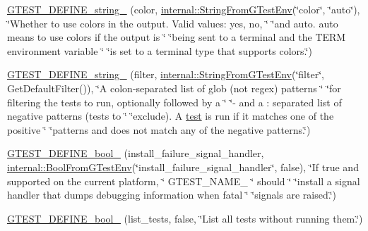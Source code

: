 \begin{DoxyCompactItemize}
\item 
\mbox{\hyperlink{namespacetesting_a32f0280e95e7718835b0e3d2f7277269}{G\+T\+E\+S\+T\+\_\+\+D\+E\+F\+I\+N\+E\+\_\+string\+\_\+}} (color, \mbox{\hyperlink{namespacetesting_1_1internal_a7ed785df46a339403b0f749d3a879201}{internal\+::\+String\+From\+G\+Test\+Env}}(\char`\"{}color\char`\"{}, \char`\"{}auto\char`\"{}), \char`\"{}Whether to use colors in the output.  Valid values\+: yes, no, \char`\"{} \char`\"{}and auto.  \textquotesingle{}auto\textquotesingle{} means to use colors if the output is \char`\"{} \char`\"{}being sent to a terminal and the T\+E\+RM environment variable \char`\"{} \char`\"{}is set to a terminal type that supports colors.\char`\"{})
\item 
\mbox{\hyperlink{namespacetesting_a2830ee1f2237233fa44aa580c5a919ce}{G\+T\+E\+S\+T\+\_\+\+D\+E\+F\+I\+N\+E\+\_\+string\+\_\+}} (filter, \mbox{\hyperlink{namespacetesting_1_1internal_a7ed785df46a339403b0f749d3a879201}{internal\+::\+String\+From\+G\+Test\+Env}}(\char`\"{}filter\char`\"{}, Get\+Default\+Filter()), \char`\"{}A colon-\/separated list of glob (not regex) patterns \char`\"{} \char`\"{}for filtering the tests to run, optionally followed by a \char`\"{} \char`\"{}\textquotesingle{}-\/\textquotesingle{} and a \+: separated list of negative patterns (tests to \char`\"{} \char`\"{}exclude).  A \mbox{\hyperlink{_mutual_8h_a707ee03719e99670bf6cfdfd897b8456}{test}} is run if it matches one of the positive \char`\"{} \char`\"{}patterns and does not match any of the negative patterns.\char`\"{})
\item 
\mbox{\hyperlink{namespacetesting_ad37eab296e354d74a81e2cedc34ac6b8}{G\+T\+E\+S\+T\+\_\+\+D\+E\+F\+I\+N\+E\+\_\+bool\+\_\+}} (install\+\_\+failure\+\_\+signal\+\_\+handler, \mbox{\hyperlink{namespacetesting_1_1internal_a67132cdce23fb71b6c38ee34ef81eb4c}{internal\+::\+Bool\+From\+G\+Test\+Env}}(\char`\"{}install\+\_\+failure\+\_\+signal\+\_\+handler\char`\"{}, false), \char`\"{}If true and supported on the current platform, \char`\"{} G\+T\+E\+S\+T\+\_\+\+N\+A\+M\+E\+\_\+ \char`\"{} should \char`\"{} \char`\"{}install a signal handler that dumps debugging information when fatal \char`\"{} \char`\"{}signals are raised.\char`\"{})
\item 
\mbox{\hyperlink{namespacetesting_a0fa31ecbf33c5e5970cca1d91c050153}{G\+T\+E\+S\+T\+\_\+\+D\+E\+F\+I\+N\+E\+\_\+bool\+\_\+}} (list\+\_\+tests, false, \char`\"{}List all tests without running them.\char`\"{})
\item 

\end{DoxyCompactItemize}
